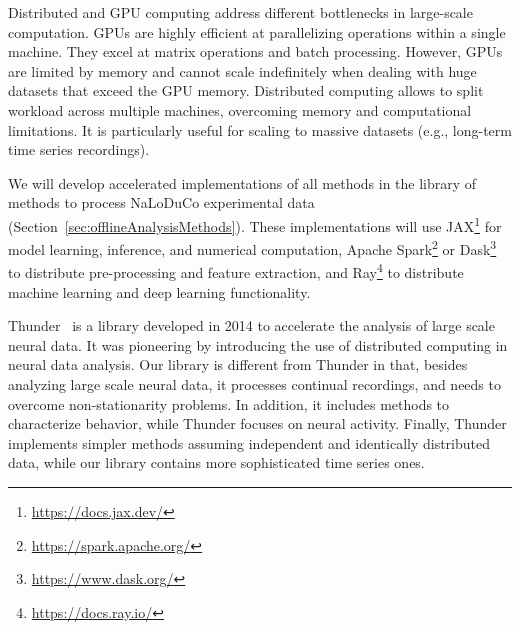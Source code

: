 Distributed and GPU computing address different bottlenecks in large-scale
computation. GPUs are highly efficient at parallelizing operations within a
single machine. They excel at matrix operations and batch processing. However,
GPUs are limited by memory and cannot scale indefinitely when dealing with huge
datasets that exceed the GPU memory.
%
Distributed computing allows to split workload across multiple machines,
overcoming memory and computational limitations. It is particularly useful for
scaling to massive datasets (e.g., long-term time series recordings).

\begin{comment}

For distributed computing to deliver substantial speed improvements,
computations must be decomposable into independent parallel tasks. Due to their
serial dependencies, time series models are difficult to decomposed in this
manner.
%
Still, time series models can benefit from distributed computing
infrastructures.

While not
all algorithms naturally support such decomposition, in machine learning
distributed computing remains valuable even for non-parallelizable algorithms.
For instance, it enables efficient hyperparameter optimization, where multiple
algorithm configurations can be tested in parallel, significantly reducing
overall runtime.



\end{comment}

We will develop accelerated implementations of all methods in the library of
methods to process NaLoDuCo experimental data
(Section~\ref{sec:offlineAnalysisMethods}). These implementations will use
JAX\footnote{\url{https://docs.jax.dev/}} for model learning, inference, and numerical computation, Apache
Spark\footnote{\url{https://spark.apache.org/}} or
Dask\footnote{\url{https://www.dask.org/}} to distribute pre-processing and
feature extraction, and Ray\footnote{\url{https://docs.ray.io/}} to distribute
machine learning and deep learning functionality.

Thunder~\cite{} is a library developed in 2014 to accelerate the analysis of
large scale neural data. It was pioneering by introducing the use of
distributed computing in neural data analysis.
%
Our library is different from Thunder in that, besides analyzing large scale
neural data, it processes continual recordings, and needs to overcome
non-stationarity problems.
%
In addition, it includes methods to characterize behavior, while
Thunder focuses on neural activity.
%
Finally, Thunder implements simpler methods assuming independent and
identically distributed data, while our library contains more sophisticated
time series ones.

